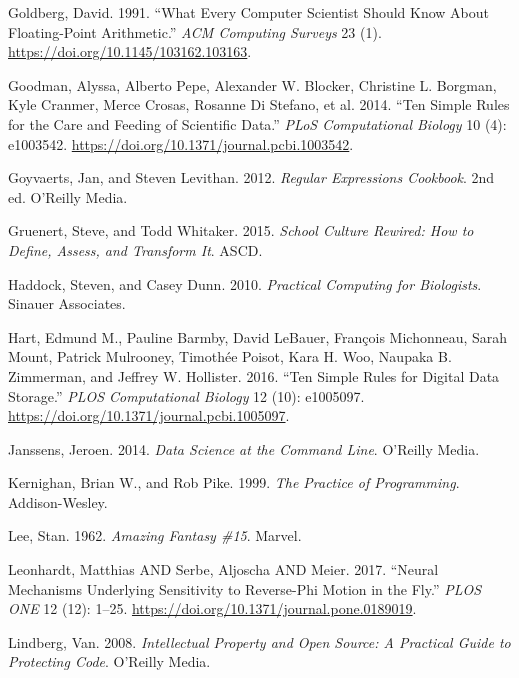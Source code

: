 \documentclass[
]{krantz}
\newlength{\cslhangindent}
\newenvironment{cslreferences}%
  {\setlength{\parindent}{0pt}%
  \everypar{\setlength{\hangindent}{\cslhangindent}}\ignorespaces}%
  {\par}
\begin{document}
\begin{cslreferences}
\leavevmode\hypertarget{ref-Gold1991}{}%
Goldberg, David. 1991. ``What Every Computer Scientist Should Know About Floating-Point Arithmetic.'' \emph{ACM Computing Surveys} 23 (1). \url{https://doi.org/10.1145/103162.103163}.

\leavevmode\hypertarget{ref-Good2014}{}%
Goodman, Alyssa, Alberto Pepe, Alexander W. Blocker, Christine L. Borgman, Kyle Cranmer, Merce Crosas, Rosanne Di Stefano, et al. 2014. ``Ten Simple Rules for the Care and Feeding of Scientific Data.'' \emph{PLoS Computational Biology} 10 (4): e1003542. \url{https://doi.org/10.1371/journal.pcbi.1003542}.

\leavevmode\hypertarget{ref-Goyv2012}{}%
Goyvaerts, Jan, and Steven Levithan. 2012. \emph{Regular Expressions Cookbook}. 2nd ed. O'Reilly Media.

\leavevmode\hypertarget{ref-Grue2015}{}%
Gruenert, Steve, and Todd Whitaker. 2015. \emph{School Culture Rewired: How to Define, Assess, and Transform It}. ASCD.

\leavevmode\hypertarget{ref-Hadd2010}{}%
Haddock, Steven, and Casey Dunn. 2010. \emph{Practical Computing for Biologists}. Sinauer Associates.

\leavevmode\hypertarget{ref-Hart2016}{}%
Hart, Edmund M., Pauline Barmby, David LeBauer, François Michonneau, Sarah Mount, Patrick Mulrooney, Timothée Poisot, Kara H. Woo, Naupaka B. Zimmerman, and Jeffrey W. Hollister. 2016. ``Ten Simple Rules for Digital Data Storage.'' \emph{PLOS Computational Biology} 12 (10): e1005097. \url{https://doi.org/10.1371/journal.pcbi.1005097}.

\leavevmode\hypertarget{ref-Jans2014}{}%
Janssens, Jeroen. 2014. \emph{Data Science at the Command Line}. O'Reilly Media.

\leavevmode\hypertarget{ref-Kern1999}{}%
Kernighan, Brian W., and Rob Pike. 1999. \emph{The Practice of Programming}. Addison-Wesley.

\leavevmode\hypertarget{ref-Lee1962}{}%
Lee, Stan. 1962. \emph{Amazing Fantasy \#15}. Marvel.

\leavevmode\hypertarget{ref-Leon2017}{}%
Leonhardt, Matthias AND Serbe, Aljoscha AND Meier. 2017. ``Neural Mechanisms Underlying Sensitivity to Reverse-Phi Motion in the Fly.'' \emph{PLOS ONE} 12 (12): 1--25. \url{https://doi.org/10.1371/journal.pone.0189019}.

\leavevmode\hypertarget{ref-Lind2008}{}%
Lindberg, Van. 2008. \emph{Intellectual Property and Open Source: A Practical Guide to Protecting Code}. O'Reilly Media.


\end{cslreferences}
\end{document}
